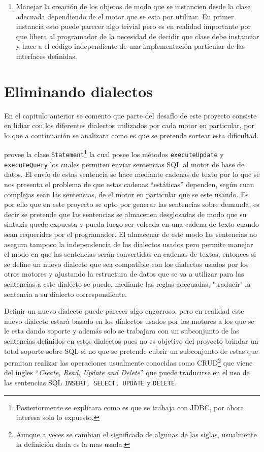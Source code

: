 \begin{enumerate}
%
\item Manejar la creación de los objetos de modo que se instancien desde la clase adecuada dependiendo de el motor que se esta por utilizar. En primer instancia esto puede parecer algo trivial pero es en realidad importante por que libera al programador de la necesidad de decidir que clase debe instanciar y hace a el código independiente de una implementación particular de las interfaces definidas.
\end{enumerate}
%
%
\section{Eliminando dialectos}
\label{seccion:especificacion:dialectos}
En el capitulo anterior se comento que parte del desafío de este proyecto consiste en lidiar con los diferentes  dialectos utilizados por cada motor en particular, por lo que a continuación se analizara como es que se pretende sortear esta dificultad.

\jd provee la clase \verb=Statement=\footnote{Posteriormente se explicara como es que se trabaja con JDBC, por ahora interesa solo lo expuesto.} la cual posee los métodos \verb=executeUpdate= y \verb=executeQuery= los cuales permiten enviar sentencias SQL al motor de base de datos. El envío de estas sentencia se hace mediante cadenas de texto por lo que se nos presenta el problema de que estas cadenas ``estáticas'' dependen, según cuan complejas sean las sentencias, de el motor en particular que se este usando. Es por ello que en este proyecto se opto por generar las sentencias sobre demanda, es decir se pretende que las sentencias se almacenen desglosadas de modo que su sintaxis quede expuesta y pueda luego ser volcada en una cadena de texto cuando sean requeridas por el programador. El almacenar de este modo las sentencias no asegura tampoco la independencia de los dialectos usados pero permite manejar el modo en que las sentencias serán convertidas en cadenas de textos, entonces si se define un nuevo dialecto que sea compatible con los dialectos usados por los otros motores y ajustando la estructura de datos que se va a utilizar para las sentencias a este dialecto se puede, mediante las reglas adecuadas, "traducir" la sentencia a su dialecto correspondiente. 

Definir un nuevo dialecto puede parecer algo engorroso, pero en realidad este nuevo dialecto estará basado en los dialectos usados por los motores a los que se le esta dando soporte y además solo se trabajara con un subconjunto de las sentencias definidos en estos dialectos pues no es objetivo del proyecto brindar un total soporte sobre SQL si no que se pretende cubrir un subconjunto de estas que permitan realizar las operaciones usualmente conocidas como CRUD\footnote{Aunque a veces se cambian el significado de algunas de las siglas, usualmente la definición dada es la mas usada.} que viene del ingles ``\textit{Create, Read, Update and Delete}'' que puede traducirse en el uso de las sentencias SQL \verb=INSERT, SELECT, UPDATE= y \verb=DELETE=.

